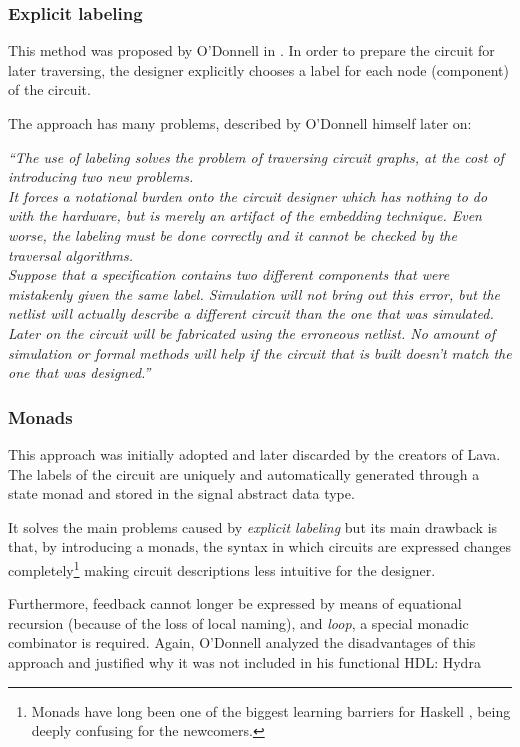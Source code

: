 \documentclass[a4paper,twoside,11pt]{article}
\begin{document}
\begin{body}
\subsubsection{Explicit labeling}
  This method was proposed by
  O'Donnell in \cite{netlists}. In order to prepare the circuit for
  later traversing, the designer explicitly chooses a label for each
  node (component) of the circuit. 

  The approach has many problems, described by O'Donnell himself
  later on:
  
  \textit{``The use of labeling solves the
    problem of traversing circuit graphs, at the cost of introducing
    two new problems. \\ It forces a notational burden onto the
    circuit designer which has nothing to do with the hardware, but is
    merely an artifact of the embedding technique.  Even worse, the
    labeling must be done correctly and it cannot be
    checked by the traversal algorithms.\\
    Suppose that a specification contains two different components that
    were mistakenly given the same label. Simulation will not bring
    out this error, but the netlist will actually describe a different
    circuit than the one that was simulated.  Later on the circuit will
    be fabricated using the erroneous netlist. No amount of simulation
    or formal methods will help if the circuit that is built doesn't
    match the one that was designed.''}\cite{hydra:th}

\subsubsection{Monads} 
This approach was initially adopted and later discarded by the
creators of Lava. The labels of the circuit are uniquely and
automatically generated through a state monad and stored in the signal
abstract data type.


It solves the main problems caused by \textit{explicit labeling} but its main
drawback is that, by introducing a monads, the syntax in which circuits are
expressed changes completely\footnote{Monads have long been one of the biggest
  learning barriers for Haskell \cite{monads}, being deeply confusing for the
  newcomers.} making circuit descriptions less intuitive for the designer.
  

  Furthermore, feedback cannot longer be expressed by means of
  equational recursion (because of the loss of local naming), and
  \textit{loop}, a special monadic combinator is required. Again,
  O'Donnell analyzed the disadvantages of this approach and justified
  why it was not included in his functional HDL: Hydra\cite{hydra}
  

\end{body}
\end{document}
